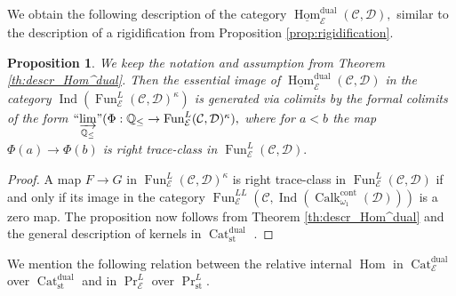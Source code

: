 \documentclass[11pt,leqno]{amsart}
\newtheorem{prop}[theo]{Proposition}
\numberwithin{equation}{section}
\def\Q{\mathbb{Q}}
\def\Hom{\operatorname{Hom}}
\newcommand{\indlim}[1][]{\mathop{\varinjlim}\limits_{#1}}
\newcommand{\inddlim}[1][]{{``{\indlim[#1]}"}}
\newcommand{\Cat}{\operatorname{Cat}}
\newcommand{\cont}{\operatorname{cont}}
\newcommand{\st}{\operatorname{st}}
\newcommand{\dual}{\operatorname{dual}}
\newcommand{\cD}{{\mathcal D}}
\newcommand{\cC}{{\mathcal C}}
\newcommand{\cE}{{\mathcal E}}
\newcommand{\un}{\underline}
\newcommand{\Fun}{\operatorname{Fun}}
\newcommand{\Ind}{\operatorname{Ind}}
\newcommand{\Calk}{\operatorname{Calk}}
\begin{document}
We obtain the following description of the category $\un{\Hom}_{\cE}^{\dual}(\cC,\cD),$ similar to the description of a rigidification from Proposition \ref{prop:rigidification}. 

\begin{prop}
We keep the notation and assumption from Theorem \ref{th:descr_Hom^dual}. Then the essential image of $\un{\Hom}_{\cE}^{\dual}(\cC,\cD)$ in the category $\Ind(\Fun_{\cE}^L(\cC,\cD)^{\kappa})$ is generated via colimits by the formal colimits of the form $\inddlim[\Q_{\leq}](\Phi:\Q_{\leq}\to \Fun_{\cE}^L(\cC,\cD)^{\kappa}),$ where for $a<b$ the map $\Phi(a)\to \Phi(b)$ is right trace-class in $\Fun^L_{\cE}(\cC,\cD).$
\end{prop}

\begin{proof}
A map $F\to G$ in $\Fun^L_{\cE}(\cC,\cD)^{\kappa}$ is right trace-class in $\Fun^L_{\cE}(\cC,\cD)$ if and only if its image in the category $\Fun_{\cE}^{LL}(\cC,\Ind(\Calk^{\cont}_{\omega_1}(\cD)))$ is a zero map. The proposition now follows from Theorem \ref{th:descr_Hom^dual} and the general description of kernels in $\Cat_{\st}^{\dual}$ \cite[Proposition 1.84]{E24}.
\end{proof}

We mention the following relation between the relative internal $\Hom$ in $\Cat_{\cE}^{\dual}$ over $\Cat_{\st}^{\dual}$ and in $\Pr_{\cE}^L$ over $\Pr^L_{\st}.$  
\end{document}
